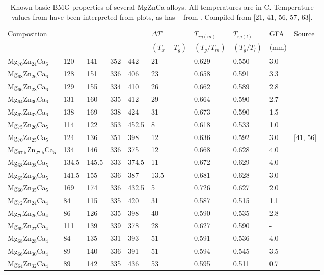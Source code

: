 \documentclass[a4paper,12pt,oneside]{report}%
\begin{document}
\begin{table}[h]
	\centering
	\begin{tabular}{ l l l l l l l l l l }
		\toprule
		Composition & \Tg  & \Tx  & \Tm  & \Tl  & $\Delta T$ & $T_{rg(m)}$ & $T_{rg(l)}$ & GFA & Source \\ 
		& & & & & $(T_{x} - T_{g})$ & $(T_{g}/T_{m})$ & $(T_{g}/T_{l})$ & (mm) & \\ 
		\midrule
		Mg$_{70}$Zn$_{24}$Ca$_{6}$ & 120 & 141 & 352 & 442 & 21 & 0.629 & 0.550 & 3.0 & \cite{Cao2013, Cao2012} \\ 
		Mg$_{68}$Zn$_{26}$Ca$_{6}$ & 128 & 151 & 336 & 406 & 23 & 0.658 & 0.591 & 3.3 & \cite{Cao2013, Cao2012} \\ 
		Mg$_{66}$Zn$_{28}$Ca$_{6}$ & 129 & 155 & 334 & 410 & 26 & 0.662 & 0.589 & 2.8 & \cite{Cao2013, Cao2012} \\ 
		Mg$_{64}$Zn$_{30}$Ca$_{6}$ & 131 & 160 & 335 & 412 & 29 & 0.664 & 0.590 & 2.7 & \cite{Cao2013, Cao2012} \\ 
		Mg$_{62}$Zn$_{32}$Ca$_{6}$ & 138 & 169 & 338 & 424 & 31 & 0.673 & 0.590 & 1.5 & \cite{Cao2013, Cao2012} \\ 
		Mg$_{75}$Zn$_{20}$Ca$_{5}$ & 114 & 122 & 353 & 452.5 & 8 & 0.618 & 0.533 & 1.0 & \cite{Gu2005} \\ 
		Mg$_{70}$Zn$_{25}$Ca$_{5}$ & 124 & 136 & 351 & 398 & 12 & 0.636 & 0.592 & 3.0 & [41, 56] \\ 
		Mg$_{67.5}$Zn$_{27.5}$Ca$_{5}$ & 134 & 146 & 336 & 375 & 12 & 0.668 & 0.628 & 4.0 & \cite{Gu2005} \\ 
		Mg$_{68}$Zn$_{28}$Ca$_{5}$ & 134.5 & 145.5 & 333 & 374.5 & 11 & 0.672 & 0.629 & 4.0 & \cite{Gu2005} \\ 
		Mg$_{65}$Zn$_{30}$Ca$_{5}$ & 141.5 & 155 & 336 & 387 & 13.5 & 0.681 & 0.628 & 3.0 & \cite{Gu2005} \\ 
		Mg$_{60}$Zn$_{35}$Ca$_{5}$ & 169 & 174 & 336 & 432.5 & 5 & 0.726 & 0.627 & 2.0 & \cite{Gu2005} \\ 
		Mg$_{72}$Zn$_{24}$Ca$_{4}$ & 84 & 115 & 335 & 420 & 31 & 0.587 & 0.515 & 1.1 & \cite{Cao2013, Cao2012} \\ 
		Mg$_{70}$Zn$_{26}$Ca$_{4}$ & 86 & 126 & 335 & 398 & 40 & 0.590 & 0.535 & 2.8 & \cite{Cao2013, Cao2012} \\ 
		Mg$_{69}$Zn$_{27}$Ca$_{4}$ & 111 & 139 & 339 & 378 & 28 & 0.627 & 0.590 & - & \cite{Wang2013} \\ 
		Mg$_{68}$Zn$_{28}$Ca$_{4}$ & 84 & 135 & 331 & 393 & 51 & 0.591 & 0.536 & 4.0 & \cite{Cao2013, Cao2012} \\ 
		Mg$_{66}$Zn$_{30}$Ca$_{4}$ & 89 & 140 & 336 & 391 & 51 & 0.594 & 0.545 & 3.5 & \cite{Cao2013, Cao2012} \\ 
		Mg$_{64}$Zn$_{32}$Ca$_{4}$ & 89 & 142 & 335 & 436 & 53 & 0.595 & 0.511 & 0.7 & \cite{Cao2013, Cao2012} \\
		\bottomrule 
	\end{tabular}
	\caption{Known basic BMG properties of several MgZnCa alloys. All temperatures are in \degree C. Temperature values from \cite{Gu2005} have been interpreted from plots, as has \Tg~ from \cite{Wang2013}. Compiled from [21, 41, 56, 57, 63].}
	\label{tab:MgZnCaAlloys}
\end{table}
\end{document}
